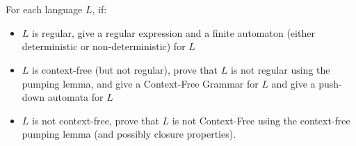 \documentclass[paper=a4, fontsize=11pt]{scrartcl} %
\begin{document}
\maketitle %

\section{}

\begin{fancyquotes}
  For each language $L$, if:
  \begin{itemize}
  \item $L$ is regular, give a regular expression and a finite
    automaton (either deterministic or non-deterministic) for $L$
  \item $L$ is context-free (but not regular), prove that $L$ is not
    regular using the pumping lemma, and give a Context-Free Grammar
    for $L$ and give a push-down automata for $L$
  \item $L$ is not context-free, prove that $L$ is not Context-Free
    using the context-free pumping lemma (and possibly closure
    properties).
  \end{itemize}
\end{fancyquotes}
\end{document}
